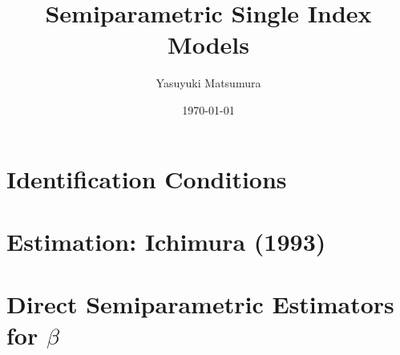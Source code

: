 \documentclass[xcolor=svgnames,dvipdfmx,cjk]{beamer}
\theoremstyle{example}
\begin{document}
 

\title[Li and Racine (2007, Chapter 8)]{Semiparametric Single Index Models} 
\author[Y. Matsumura]{Yasuyuki Matsumura}          
\date{\today}


\begin{frame}                  
\titlepage                     
\end{frame}


\begin{frame}                  
\tableofcontents
\end{frame}



\section{Identification Conditions}
\begin{frame}
  \tableofcontents[currentsection]
\end{frame}








\section{Estimation: Ichimura (1993)}
\begin{frame}
  \tableofcontents[currentsection]
\end{frame}









\section{Direct Semiparametric Estimators for $\beta$}
\begin{frame}
  \tableofcontents[currentsection]
\end{frame}
\end{document}
